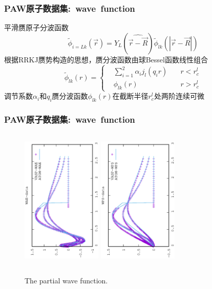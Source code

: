 \frame
{
	\frametitle{\textrm{PAW}原子数据集:~\textrm{wave~function}}
	平滑赝原子分波函数
	\begin{displaymath}
		\tilde\phi_{i=Lk}(\vec r)=Y_L(\widehat{\vec r-\vec R})\tilde\phi_{lk}(|\vec r-\vec R|)
	\end{displaymath}
	根据\textrm{RRKJ}赝势构造的思想，赝分波函数由球\textrm{Bessel}函数线性组合%
	\begin{displaymath}
		\tilde\phi_{lk}(r)=\left\{
		\begin{aligned}
			&\sum_{i=1}^2\alpha_ij_l(q_ir)\quad &r<r_c^l\\
			&\phi_{lk}(r)\quad&r>r_c^l
		\end{aligned}
		\right.
	\end{displaymath}
	调节系数$\alpha_i$和$q_i$赝分波函数$\phi_{lk}(r)$在截断半径$r_c^l$处两阶连续可微
}

\frame
{
	\frametitle{\textrm{PAW}原子数据集:~\textrm{wave~function}}
\begin{figure}[h!]
\centering
\vskip -0.5in
\includegraphics[width=1.5in,height=2.7in,viewport=0 0 350 550, angle=-90, clip]{Figures/WAE-data.eps}
\vskip -0.2in
\includegraphics[height=2.7in,width=1.5in,viewport=0 0 350 550, angle=-90, clip]{Figures/WPS-data.eps}
\caption{\tiny \textrm{The partial wave function.}}%
\label{Wave_Function}
\end{figure}
}

